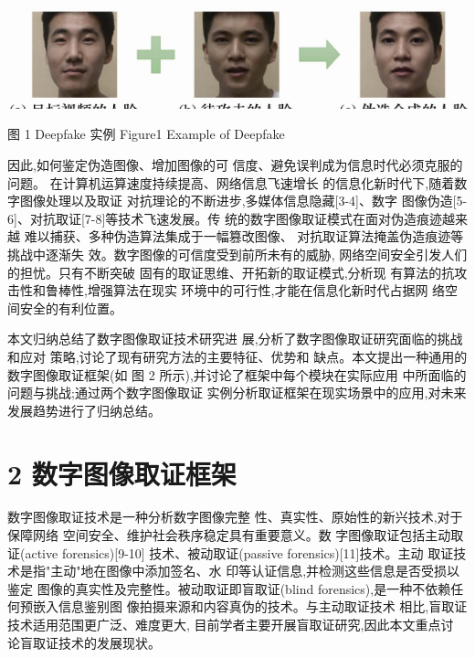 \documentclass{article}
\begin{document}
\includegraphics{_page_1_Picture_7.png}


图 1 Deepfake 实例 Figure1 Example of Deepfake

因此,如何鉴定伪造图像、增加图像的可 信度、避免误判成为信息时代必须克服的问题。 在计算机运算速度持续提高、网络信息飞速增长 的信息化新时代下,随着数字图像处理以及取证 对抗理论的不断进步,多媒体信息隐藏[3-4]、数字 图像伪造[5-6]、对抗取证[7-8]等技术飞速发展。传 统的数字图像取证模式在面对伪造痕迹越来越 难以捕获、多种伪造算法集成于一幅篡改图像、 对抗取证算法掩盖伪造痕迹等挑战中逐渐失 效。数字图像的可信度受到前所未有的威胁, 网络空间安全引发人们的担忧。只有不断突破 固有的取证思维、开拓新的取证模式,分析现 有算法的抗攻击性和鲁棒性,增强算法在现实 环境中的可行性,才能在信息化新时代占据网 络空间安全的有利位置。

本文归纳总结了数字图像取证技术研究进 展,分析了数字图像取证研究面临的挑战和应对 策略,讨论了现有研究方法的主要特征、优势和 缺点。本文提出一种通用的数字图像取证框架(如 图 2 所示),并讨论了框架中每个模块在实际应用 中所面临的问题与挑战;通过两个数字图像取证 实例分析取证框架在现实场景中的应用,对未来 发展趋势进行了归纳总结。

\section{2 数字图像取证框架}

数字图像取证技术是一种分析数字图像完整 性、真实性、原始性的新兴技术,对于保障网络 空间安全、维护社会秩序稳定具有重要意义。数 字图像取证包括主动取证(active forensics)[9-10] 技术、被动取证(passive forensics)[11]技术。主动 取证技术是指"主动"地在图像中添加签名、水 印等认证信息,并检测这些信息是否受损以鉴定 图像的真实性及完整性。被动取证即盲取证(blind forensics),是一种不依赖任何预嵌入信息鉴别图 像拍摄来源和内容真伪的技术。与主动取证技术 相比,盲取证技术适用范围更广泛、难度更大, 目前学者主要开展盲取证研究,因此本文重点讨 论盲取证技术的发展现状。
\end{document}
